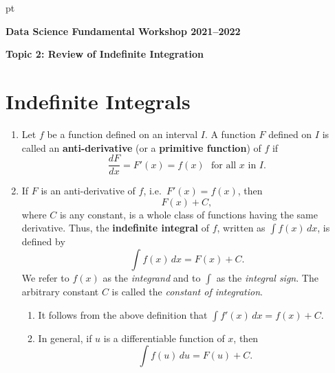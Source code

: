 \documentclass[12pt]{article}
\newenvironment{notes}{\noindent{\bf Notes }}{\vspace{0mm}}
\newcommand{\ds}{\displaystyle}
\begin{document}
 pt

\begin{center}
{\bf \large Data Science Fundamental Workshop 2021--2022}
\end{center}

\begin{center}
{\bf \large Topic 2: Review of Indefinite Integration}
\end{center}

\vspace{0.2cm}

\section{Indefinite Integrals}

\begin{enumerate}
\item[1.]
Let $f$ be a function defined on an interval $I$. A function $F$ defined on $I$ is called an {\bf anti-derivative} (or a {\bf primitive function}) of $f$ if
$$
\frac{dF}{dx} = F'(x) = f(x)  \ \ \ \mbox{for all $x$ in $I$}.
$$

\item[2.]
If $F$ is an anti-derivative of $f$, i.e.~$F'(x) = f(x)$, then
$$
F(x) + C,
$$
where $C$ is any constant, is a whole class of functions having the same derivative. Thus, the {\bf indefinite integral} of $f$, written as $\ds \int f(x) \, dx$, is defined by
$$
\int f(x) \, dx = F(x) + C.
$$
We refer to $f(x)$ as the {\em integrand\/} and to $\ds \int$ as the {\em integral sign\/}. The arbitrary constant $C$ is called the {\em constant of integration\/}.

\vspace{0.2cm}

\begin{notes}
	\begin{enumerate}
		\item[(a)]
		 It follows from the above definition that $\ds \int f'(x) \, dx = f(x) + C$.
		 \item[(b)] 
		 In general, if $u$ is a differentiable function of $x$, then
		 \begin{equation}\label{eq4.1}
		 \int f(u) \, du = F(u) + C.
		 \end{equation}
		\end{enumerate}
\end{notes}


\end{enumerate}
\end{document}
